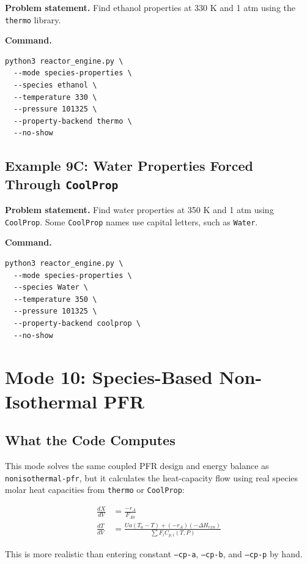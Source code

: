 \documentclass[11pt]{article}
\begin{document}
\textbf{Problem statement.} Find ethanol properties at 330 K and 1 atm using the \texttt{thermo} library.

\textbf{Command.}

\begin{lstlisting}
python3 reactor_engine.py \
  --mode species-properties \
  --species ethanol \
  --temperature 330 \
  --pressure 101325 \
  --property-backend thermo \
  --no-show
\end{lstlisting}

\subsection{Example 9C: Water Properties Forced Through \texttt{CoolProp}}

\textbf{Problem statement.} Find water properties at 350 K and 1 atm using \texttt{CoolProp}. Some \texttt{CoolProp} names use capital letters, such as \texttt{Water}.

\textbf{Command.}

\begin{lstlisting}
python3 reactor_engine.py \
  --mode species-properties \
  --species Water \
  --temperature 350 \
  --pressure 101325 \
  --property-backend coolprop \
  --no-show
\end{lstlisting}

\section{Mode 10: Species-Based Non-Isothermal PFR}

\subsection{What the Code Computes}

This mode solves the same coupled PFR design and energy balance as \texttt{nonisothermal-pfr}, but it calculates the heat-capacity flow using real species molar heat capacities from \texttt{thermo} or \texttt{CoolProp}:

\begin{align}
\frac{dX}{dV} &= \frac{-r_A}{F_{A0}} \\
\frac{dT}{dV} &= \frac{Ua(T_a - T) + (-r_A)(-\Delta H_{rxn})}{\sum F_i C_{p,i}(T,P)}
\end{align}

This is more realistic than entering constant \texttt{--cp-a}, \texttt{--cp-b}, and \texttt{--cp-p} by hand.
\end{document}
